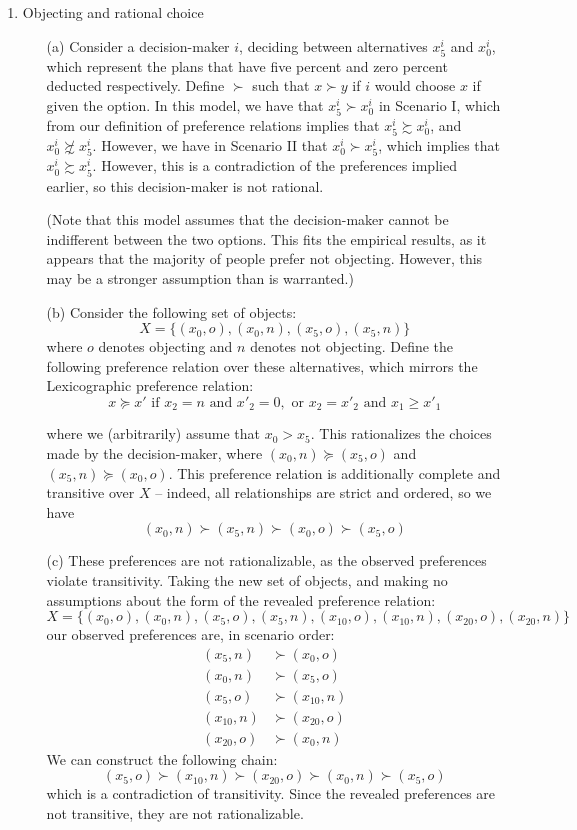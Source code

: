 \documentclass[12pt]{article}
\begin{document}
\begin{enumerate}
\item Objecting and rational choice

\begin{itemize}
	\item[(a)] Consider a decision-maker $i$, deciding between alternatives $x^i_5$ and $x^i_0$, which represent the plans that have five percent and zero percent deducted respectively. Define $\succ$ such that $x \succ y$ if $i$ would choose $x$ if given the option. In this model, we have that $x^i_5 \succ x^i_0$ in Scenario I, which from our definition of preference relations implies that $x^i_5 \succsim x^i_0$, and $x^i_0 \not\succsim x^i_5$. However, we have in Scenario II that $x^i_0 \succ x^i_5$, which implies that $x^i_0 \succsim x^i_5$. However, this is a contradiction of the preferences implied earlier, so this decision-maker is not rational.
	
	(Note that this model assumes that the decision-maker cannot be indifferent between the two options. This fits the empirical results, as it appears that the majority of people prefer not objecting. However, this may be a stronger assumption than is warranted.)
	
	\item[(b)] Consider the following set of objects:
	\[
		X = \{ (x_0,o), (x_0,n), (x_5,o), (x_5,n)\}
	\]
	where $o$ denotes objecting and $n$ denotes not objecting. Define the following preference relation over these alternatives, which mirrors the Lexicographic preference relation:
	\[
	x \succeq x' \text{ if } x_2 = n \text{ and } x'_2 = 0, \text{ or } x_2 = x'_2 \text{ and } x_1 \ge x'_1	\]

	where we (arbitrarily) assume that $x_0 > x_5$. This rationalizes the choices made by the decision-maker, where $(x_0,n) \succeq (x_5,o)$ and $(x_5,n) \succeq (x_0,o)$. This preference relation is additionally complete and transitive over $X$ -- indeed, all relationships are strict and ordered, so we have
	\[
	(x_0,n) \succ (x_5,n) \succ (x_0,o) \succ (x_5,o)
	\]	
	
	\item[(c)] These preferences are not rationalizable, as the observed preferences violate transitivity. Taking the new set of objects, and making no assumptions about the form of the revealed preference relation:
	\[
	X = \{ (x_0,o), (x_0,n), (x_5,o), (x_5,n), (x_{10},o), (x_{10},n), (x_{20},o),(x_{20},n)\}
	\]
	our observed preferences are, in scenario order:
	\begin{align*}
		(x_5,n) &\succ (x_0,o) \\
		(x_0,n) &\succ (x_5,o) \\
		(x_{5},o) &\succ (x_{10},n) \\
		(x_{10},n) &\succ (x_{20},o) \\
		(x_{20},o) &\succ (x_0,n)
	\end{align*}
	We can construct the following chain:
	\[
	(x_{5},o) \succ (x_{10},n)\succ (x_{20},o)\succ (x_0,n)\succ (x_5,o)
	\]
	which is a contradiction of transitivity. Since the revealed preferences are not transitive, they are not rationalizable.
\end{itemize}




\end{enumerate}
\end{document}
